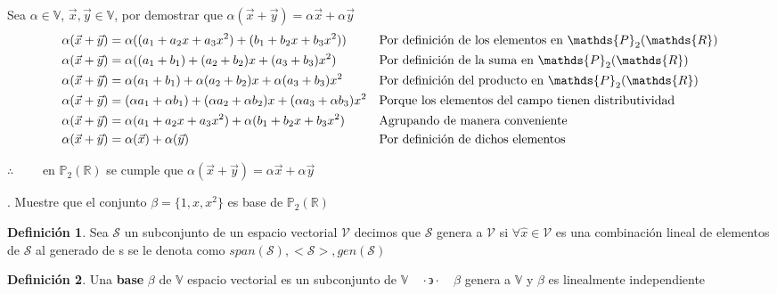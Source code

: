 \documentclass[letterpaper]{article}
\newcommand{\V}{\mathds{V}}
\newcommand{\tq}{ \quad \cdot  \backepsilon \cdot \quad }
\newcommand{\Po}{\mathds{P}_2(\mathds{R})}
\renewcommand{\*}{\cdot}
\theoremstyle{definition}
\newtheorem{definition}{Definición}
\begin{document}
Sea $ \alpha \in \V $, $ \vec{x}, \vec{y} \in \V $, por demostrar que $ \alpha(\vec{x} + \vec{y}) = \alpha\vec{x} + \alpha\vec{y}$
\begin{align*}
	\alpha(\vec{x} + \vec{y}) &= \alpha( (a_1 + a_2x + a_3x^2) + (b_1 + b_2x + b_3x^2) ) && \text{Por definición de los elementos en $ \Po $}\\
	\alpha(\vec{x} + \vec{y}) &= \alpha((a_1 + b_1) + (a_2 + b_2)x + (a_3 + b_3)x^2)&& \text{Por definición de la suma en $ \Po $}\\
	\alpha(\vec{x} + \vec{y}) &= \alpha(a_1 + b_1) + \alpha(a_2 + b_2)x + \alpha(a_3 + b_3)x^2&& \text{Por definición del producto en $ \Po $}\\
	\alpha(\vec{x} + \vec{y}) &= (\alpha a_1 + \alpha b_1) + (\alpha a_2 + \alpha b_2)x + (\alpha a_3 +\alpha b_3)x^2&& \text{Porque los elementos del campo tienen distributividad}\\
	\alpha(\vec{x} + \vec{y}) &= \alpha(a_1 + a_2x + a_3x^2) + \alpha(b_1 + b_2x + b_3x^2)&& \text{Agrupando de manera conveniente}\\
	\alpha(\vec{x} + \vec{y}) &= \alpha(\vec{x}) + \alpha(\vec{y})&& \text{Por definición de dichos elementos}\\
\end{align*}
\begin{center}
	$ \therefore \qquad $ en $ \Po $ se cumple que $ \alpha(\vec{x} + \vec{y}) = \alpha\vec{x} + \alpha\vec{y} $
\end{center}



. Muestre que el conjunto  $\beta =  \{ 1, x , x^2 \}$ es base de $ \mathbb{P}_{2}(\mathbb{R})$
\begin{definition}
	Sea $ \mathcal{S} $ un subconjunto de un espacio vectorial $ \mathcal{V} $ decimos que $ \mathcal{S} $ genera a $ \mathcal{V} $ si $ \forall \hat{x} \in \mathcal{V} $ es una combinación lineal de elementos de $ \mathcal{S} $ al generado de s se le denota como $ span(\mathcal{S}), <\mathcal{S}>, gen(\mathcal{S})$ 
\end{definition}

\begin{definition}
	Una \textbf{base} $ \beta $ de $ \V $ espacio vectorial es un subconjunto de $ \V \tq \beta$  genera a $ \V $ y $ \beta $ es linealmente independiente
\end{definition}
\end{document}
